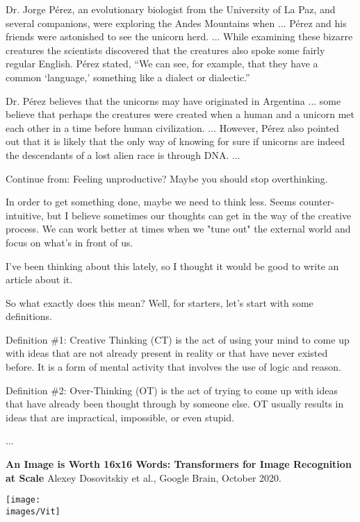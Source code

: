{Dr. Jorge Pérez, an evolutionary biologist from the University of La Paz, and several companions, were exploring the Andes Mountains when ...
Pérez and his friends were astonished to see the unicorn herd. ...
While examining these bizarre creatures the scientists discovered that the creatures also spoke some fairly regular English. Pérez stated, “We can see, for example, that they have a common ‘language,’ something like a dialect or dialectic.”

Dr. Pérez believes that the unicorns may have originated in Argentina ... some believe that perhaps the creatures were created when a human and a unicorn met each other in a time before human civilization. ... However, Pérez also pointed out that it is likely that the only way of knowing for sure if unicorns are indeed the descendants of a lost alien race is through DNA. ...



\vfill
{\color{red} Continue from: Feeling unproductive? Maybe you should stop overthinking.}

\vfill
In order to get something done, maybe we need to think less. Seems counter-intuitive, but I believe sometimes our thoughts can get in the way of the creative process. We can work better at times when we "tune out" the external world and focus on what's in front of us.

\vfill
I've been thinking about this lately, so I thought it would be good to write an article about it. 

\vfill
So what exactly does this mean? Well, for starters, let's start with some definitions.

\vfill
Definition \#1: Creative Thinking (CT) is the act of using your mind to come up with ideas that are not already present in reality or that have never existed before. It is a form of mental activity that involves the use of logic and reason.

\vfill
Definition \#2: Over-Thinking (OT) is the act of trying to come up with ideas that have already been thought through by someone else. OT usually results in ideas that are impractical, impossible, or even stupid.

\vfill
...



{\bf An Image is Worth 16x16 Words: Transformers for Image Recognition at Scale} Alexey Dosovitskiy et al., Google Brain, October 2020.

\vfill
\centerline{\texttt{[image: \\images/Vit]}}

}
